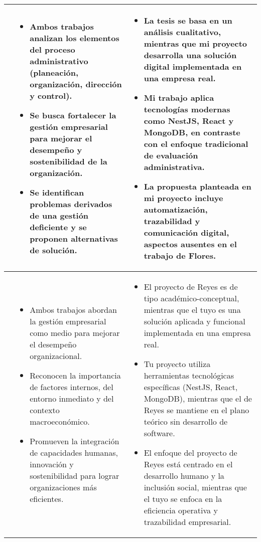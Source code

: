 \begin{longtable}{m{.05\paperwidth} *{2}{m{.33\paperwidth}} @{}}
	\cite{Flores15} &
	\begin{itemize}[topsep=0pt,itemsep=0pt,parsep=0pt,partopsep=0pt,leftmargin=*]
		\item Ambos trabajos analizan los elementos del proceso administrativo (planeación, organización, dirección y control).
		\item Se busca fortalecer la gestión empresarial para mejorar el desempeño y sostenibilidad de la organización.
		\item Se identifican problemas derivados de una gestión deficiente y se proponen alternativas de solución.
	\end{itemize} &
	\begin{itemize}[topsep=0pt,itemsep=0pt,parsep=0pt,partopsep=0pt,leftmargin=*]
		\item La tesis se basa en un análisis cualitativo, mientras que mi proyecto desarrolla una solución digital implementada en una empresa real.
		\item Mi trabajo aplica tecnologías modernas como NestJS, React y MongoDB, en contraste con el enfoque tradicional de evaluación administrativa.
		\item La propuesta planteada en mi proyecto incluye automatización, trazabilidad y comunicación digital, aspectos ausentes en el trabajo de Flores.
	\end{itemize} \\
	\midrule
	
	\cite{Reyes12} &
	\begin{itemize}[topsep=0pt,itemsep=0pt,parsep=0pt,partopsep=0pt,leftmargin=*]
		\item Ambos trabajos abordan la gestión empresarial como medio para mejorar el desempeño organizacional.
		\item Reconocen la importancia de factores internos, del entorno inmediato y del contexto macroeconómico.
		\item Promueven la integración de capacidades humanas, innovación y sostenibilidad para lograr organizaciones más eficientes.
	\end{itemize} &
	\begin{itemize}[topsep=0pt,itemsep=0pt,parsep=0pt,partopsep=0pt,leftmargin=*]
		\item El proyecto de Reyes es de tipo académico-conceptual, mientras que el tuyo es una solución aplicada y funcional implementada en una empresa real.
		\item Tu proyecto utiliza herramientas tecnológicas específicas (NestJS, React, MongoDB), mientras que el de Reyes se mantiene en el plano teórico sin desarrollo de software.
		\item El enfoque del proyecto de Reyes está centrado en el desarrollo humano y la inclusión social, mientras que el tuyo se enfoca en la eficiencia operativa y trazabilidad empresarial.
	\end{itemize} \\
	\midrule
	

\end{longtable}
